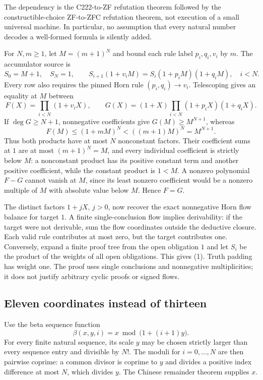 \documentclass[11pt]{article}
\begin{document}
The dependency is the C222-to-ZF refutation theorem followed by the
constructible-choice ZF-to-ZFC refutation theorem, not execution of a
small universal machine.  In particular, no assumption that every natural
number decodes a well-formed formula is silently added.

For $N,m\ge1$, let $M=(m+1)^N$ and bound each rule label $p_i,q_i,v_i$
by $m$.  The accumulator source is
\[
 S_0=M+1,\quad S_N=1,\qquad
 S_{i+1}(1+v_iM)=S_i(1+p_iM)(1+q_iM),\quad i<N.
 \tag{1}
\]
Every row also requires the pinned Horn rule $(p_i,q_i)\to v_i$.
Telescoping gives an equality at $M$ between
\[
 F(X)=\prod_{i<N}(1+v_iX),\qquad
 G(X)=(1+X)\prod_{i<N}(1+p_iX)(1+q_iX).
\]
If $\deg G\ge N+1$, nonnegative coefficients give
$G(M)\ge M^{N+1}$, whereas
\[
 F(M)\le(1+mM)^N<((m+1)M)^N=M^{N+1}.
\]
Thus both products have at most $N$ nonconstant factors.  Their coefficient
sums at $1$ are at most $(m+1)^N=M$, and every individual coefficient is
strictly below $M$: a nonconstant product has its positive constant term
and another positive coefficient, while the constant product is $1<M$.
A nonzero polynomial $F-G$ cannot vanish at $M$, since its least nonzero
coefficient would be a nonzero multiple of $M$ with absolute value below
$M$.  Hence $F=G$.

The distinct factors $1+jX$, $j>0$, now recover the exact nonnegative
Horn flow balance for target $1$.  A finite single-conclusion flow implies
derivability: if the target were not derivable, sum the flow coordinates
outside the deductive closure.  Each valid rule contributes at most zero,
but the target contributes one.  Conversely, expand a finite proof tree
from the open obligation $1$ and let $S_i$ be the product of the weights
of all open obligations.  This gives (1).  Truth padding has weight one.
The proof uses single conclusions and nonnegative multiplicities; it does
not justify arbitrary cyclic proofs or signed flows.

\subsection{Eleven coordinates instead of thirteen}

Use the beta sequence function
\[
 \beta(x,y,i)=x\bmod\bigl(1+(i+1)y\bigr).
\]
For every finite natural sequence, its scale $y$ may be chosen strictly
larger than every sequence entry and divisible by $N!$.  The moduli for
$i=0,\ldots,N$ are then pairwise coprime: a common divisor is coprime to
$y$ and divides a positive index difference at most $N$, which divides
$y$.  The Chinese remainder theorem supplies $x$.
\end{document}
